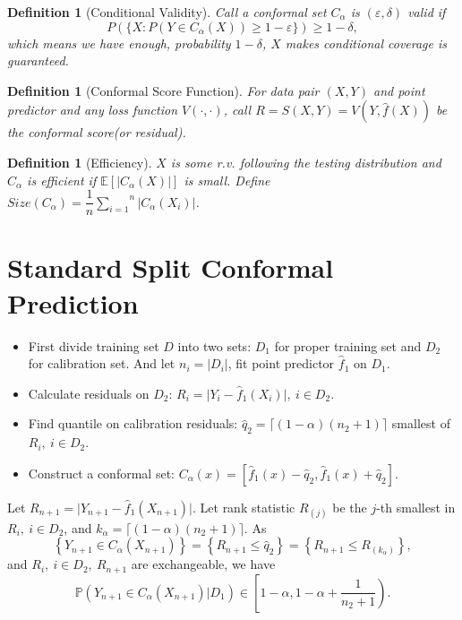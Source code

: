 \documentclass[12pt, a4paper, oneside]{article}
\newtheorem{definition}[theorem]{Definition}
\begin{document}
    \begin{definition}[Conditional Validity]\cite{vovk2012conditional}
        Call a conformal set $C_\alpha$ is $(\varepsilon,\delta)$ valid if 
        \begin{equation*}
            P(\{X:P(Y\in C_\alpha(X))\geq 1-\varepsilon\})\geq 1-\delta,
        \end{equation*}
        which means we have enough, probability $1-\delta$, $X$ makes conditional coverage is guaranteed.
    \end{definition}


    \begin{definition}[Conformal Score Function]
        For data pair $(X,Y)$ and point predictor and any loss function $V(\cdot,\cdot)$, call $R=S(X,Y)=V(Y,\hat{f}(X))$ be the conformal score(or residual).
    \end{definition}


    \begin{definition}[Efficiency]
        $X$ is some r.v. following the testing distribution and $C_\alpha$ is efficient if $\mathbb{E}\left[ |C_\alpha(X)| \right]$ is small. Define $Size(C_\alpha)=\dfrac{1}{n}\overset{n}{\underset{i=1}\sum}|C_\alpha(X_i)|$.
    \end{definition}


\section{Standard Split Conformal Prediction}
    \begin{itemize}
        \item First divide training set $D$ into two sets: $D_1$ for proper training set and $D_2$ for calibration set. And let $n_i=|D_i|$, fit point predictor $\hat{f}_1$ on $D_1$.
        \item Calculate residuals on $D_2$: $R_i=\Big|Y_i-\hat{f}_1(X_i)\Big|,\ i\in D_2$.
        \item Find quantile on calibration residuals: $\hat{q}_2=\lceil (1-\alpha)(n_2+1)\rceil$ smallest of $R_i,\ i\in D_2$.
        \item Construct a conformal set: $C_\alpha(x)=\left[ \hat{f}_1(x)-\hat{q}_2,\hat{f}_1(x)+\hat{q}_2 \right]$.
    \end{itemize}


    Let $R_{n+1}=\Big|Y_{n+1}-\hat{f}_1(X_{n+1})\Big|$. Let rank statistic $R_{(j)}$ be the $j$-th smallest in $R_i,\ i\in D_2$, and $k_\alpha=\lceil (1-\alpha)(n_2+1)\rceil$. As
    \begin{equation*}
        \left\{ Y_{n+1}\in C_\alpha(X_{n+1}) \right\}=\left\{ R_{n+1}\leq\hat{q}_2 \right\}=\left\{ R_{n+1}\leq R_{(k_\alpha)} \right\},
    \end{equation*}
    and $R_i,\ i\in D_2,\ R_{n+1}$ are exchangeable, we have
    \begin{equation*}
        \mathbb{P}\left( Y_{n+1}\in C_\alpha(X_{n+1})\Big|D_1 \right)\in\left[ 1-\alpha,1-\alpha+\dfrac{1}{n_2+1} \right).
    \end{equation*}
\end{document}
